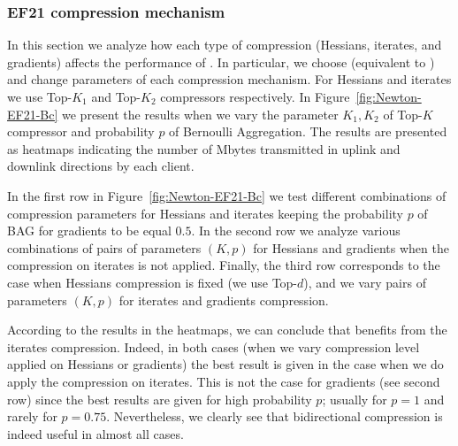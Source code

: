 \documentclass[11pt]{article}
\begin{document}
	\subsubsection{EF21 compression mechanism}
	
	In this section we analyze how each type of compression (Hessians, iterates, and gradients) affects the performance of . In particular, we choose  (equivalent to ) and change parameters of each compression mechanism. For Hessians and iterates we use Top-$K_1$ and Top-$K_2$ compressors respectively. In Figure~\ref{fig:Newton-EF21-Bc} we present the results when we vary the parameter $K_1, K_2$ of Top-$K$ compressor and probability $p$ of Bernoulli Aggregation. The results are presented as heatmaps indicating the number of Mbytes transmitted in uplink and downlink directions by each client.
	
	In the first row in Figure~\ref{fig:Newton-EF21-Bc} we test different combinations of compression parameters for Hessians and iterates keeping the probability $p$ of BAG for gradients to be equal $0.5$. In the second row we analyze various combinations of pairs of parameters $(K, p)$ for Hessians and gradients when the compression on iterates is not applied. Finally, the third row corresponds to the case when Hessians compression is fixed (we use Top-$d$), and we vary pairs of parameters $(K, p)$ for iterates and gradients compression.
	
	According to the results in the heatmaps, we can conclude that  benefits from the iterates compression. Indeed, in both cases (when we vary compression level applied on Hessians or gradients) the best result is given in the case when we do apply the compression on iterates. This is not the case for gradients (see second row) since the best results are given for high probability $p$; usually for $p=1$ and rarely for $p=0.75$. Nevertheless, we clearly see that bidirectional compression is indeed useful in almost all cases.
	
\end{document}
